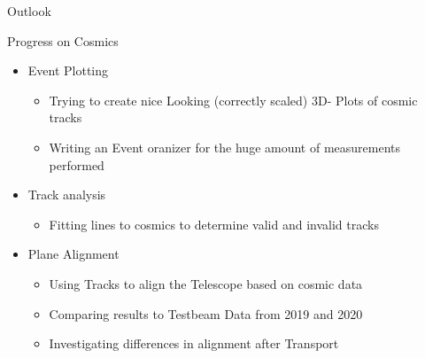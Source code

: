 \documentclass{beamer}
\begin{document}
\begin{frame}{Outlook}
    \begin{minipage}{.44\textwidth}
	\LARGE Progress on Cosmics \normalsize \\
	\begin{itemize}
	    \item Event Plotting
		\begin{itemize}
		    \item \tiny Trying to create nice Looking (correctly scaled) 3D-
			Plots of cosmic tracks
		    \item Writing an Event oranizer for the huge amount of
			measurements performed
		\end{itemize}
	    \item Track analysis
		\begin{itemize}
		    \item \tiny Fitting lines to cosmics to determine valid and
			invalid tracks
		\end{itemize}
	    \item Plane Alignment
		\begin{itemize}
		    \item \tiny Using Tracks to align the Telescope  based on
			cosmic data
		    \item Comparing results to Testbeam Data from 2019 and 2020
		    \item Investigating differences in alignment after Transport
		\end{itemize}
	

\end{itemize}
\end{minipage}
\end{frame}
\end{document}
